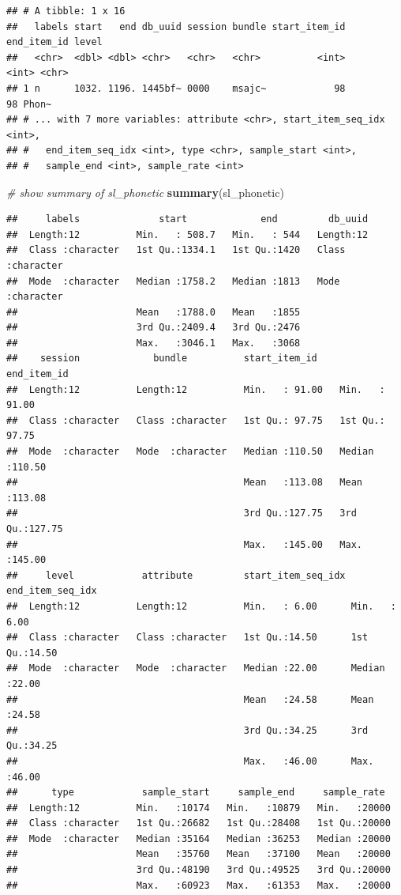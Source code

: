 \documentclass[]{book}
\newenvironment{Shaded}{\begin{snugshade}}{\end{snugshade}}
\newcommand{\CommentTok}[1]{\textcolor[rgb]{0.56,0.35,0.01}{\textit{#1}}}
\newcommand{\KeywordTok}[1]{\textcolor[rgb]{0.13,0.29,0.53}{\textbf{#1}}}
\newcommand{\NormalTok}[1]{#1}
\begin{document}
\begin{verbatim}
## # A tibble: 1 x 16
##   labels start   end db_uuid session bundle start_item_id end_item_id level
##   <chr>  <dbl> <dbl> <chr>   <chr>   <chr>          <int>       <int> <chr>
## 1 n      1032. 1196. 1445bf~ 0000    msajc~            98          98 Phon~
## # ... with 7 more variables: attribute <chr>, start_item_seq_idx <int>,
## #   end_item_seq_idx <int>, type <chr>, sample_start <int>,
## #   sample_end <int>, sample_rate <int>
\end{verbatim}

\begin{Shaded}
\begin{Highlighting}[]
\CommentTok{# show summary of sl_phonetic}
\KeywordTok{summary}\NormalTok{(sl_phonetic)}
\end{Highlighting}
\end{Shaded}

\begin{verbatim}
##     labels              start             end         db_uuid         
##  Length:12          Min.   : 508.7   Min.   : 544   Length:12         
##  Class :character   1st Qu.:1334.1   1st Qu.:1420   Class :character  
##  Mode  :character   Median :1758.2   Median :1813   Mode  :character  
##                     Mean   :1788.0   Mean   :1855                     
##                     3rd Qu.:2409.4   3rd Qu.:2476                     
##                     Max.   :3046.1   Max.   :3068                     
##    session             bundle          start_item_id     end_item_id    
##  Length:12          Length:12          Min.   : 91.00   Min.   : 91.00  
##  Class :character   Class :character   1st Qu.: 97.75   1st Qu.: 97.75  
##  Mode  :character   Mode  :character   Median :110.50   Median :110.50  
##                                        Mean   :113.08   Mean   :113.08  
##                                        3rd Qu.:127.75   3rd Qu.:127.75  
##                                        Max.   :145.00   Max.   :145.00  
##     level            attribute         start_item_seq_idx end_item_seq_idx
##  Length:12          Length:12          Min.   : 6.00      Min.   : 6.00   
##  Class :character   Class :character   1st Qu.:14.50      1st Qu.:14.50   
##  Mode  :character   Mode  :character   Median :22.00      Median :22.00   
##                                        Mean   :24.58      Mean   :24.58   
##                                        3rd Qu.:34.25      3rd Qu.:34.25   
##                                        Max.   :46.00      Max.   :46.00   
##      type            sample_start     sample_end     sample_rate   
##  Length:12          Min.   :10174   Min.   :10879   Min.   :20000  
##  Class :character   1st Qu.:26682   1st Qu.:28408   1st Qu.:20000  
##  Mode  :character   Median :35164   Median :36253   Median :20000  
##                     Mean   :35760   Mean   :37100   Mean   :20000  
##                     3rd Qu.:48190   3rd Qu.:49525   3rd Qu.:20000  
##                     Max.   :60923   Max.   :61353   Max.   :20000
\end{verbatim}
\end{document}
